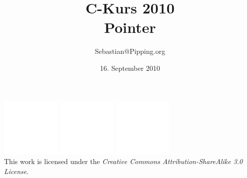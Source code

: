 \documentclass{beamer}
\title{C-Kurs 2010\\Pointer}
\author{Sebastian@Pipping.org}
\date{16. September 2010}
\newcommand{\CcLongnameBySa}{Attribution-ShareAlike}
\newcommand{\CcImageBy}[1]{%
	\includegraphics[scale=#1]{creative-commons/cc-by-white.pdf}%
}
\newcommand{\CcImageNc}[1]{%
	\includegraphics[scale=#1]{creative-commons/cc-nc-white.pdf}%
}
\newcommand{\CcImageSa}[1]{%
	\includegraphics[scale=#1]{creative-commons/cc-sa-white.pdf}%
}
\newcommand{\CcNote}[1]{%
	This work is licensed under the \textit{Creative Commons #1 3.0 License}.%
}
\newcommand{\CcGroupByNcSa}[2]{%
	\CcImageBy{#1}\hspace*{#2}\CcImageNc{#1}\hspace*{#2}\CcImageSa{#1}%
}
\begin{document}

\begin{frame}
	\titlepage
	\vfill
	\begin{center}
		\CcGroupByNcSa{0.33}{0.95ex}\\[2.5ex]
		{\tiny\CcNote{\CcLongnameBySa}}
		\vspace*{-2.5ex}
	\end{center}
\end{frame}


\end{document}

